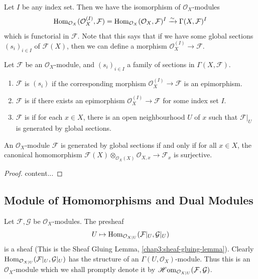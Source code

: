 Let $I$ be any index set. Then we have the isomorphism of $\mathcal{O}_X$-modules
\begin{equation*}
	\operatorname{Hom}_{\mathcal{O}_X}(\mathcal{O}_X^{(I)}, \mathcal{F}) = \operatorname{Hom}_{\mathcal{O}_X}(\mathcal{O}_X, \mathcal{F})^I \xrightarrow{\sim} \Gamma(X, \mathcal{F})^I
\end{equation*}
which is functorial in $\mathcal{F}$. Note that this says that if we have some global sections $(s_i)_{i \in I}$ of $\mathcal{F}(X)$, then we can define a morphism $\mathcal{O}_X^{(I)} \to \mathcal{F}$.

\begin{definition}
	Let $\mathcal{F}$ be an $\mathcal{O}_X$-module, and $(s_i)_{i\in I}$ a family of sections in $\Gamma(X, \mathcal{F})$. 
	
	\begin{enumerate}
		\item $\mathcal{F}$ is  $(s_i)$ if the corresponding morphism $\mathcal{O}_X^{(I)} \to \mathcal{F}$ is an epimorphism.
		
		\item $\mathcal{F}$ is  if there exists an epimorphism $\mathcal{O}_X^{(I)} \to \mathcal{F}$ for some index set $I$.
		
		\item $\mathcal{F}$ is  if for each $x \in X$, there is an open neighbourhood $U$ of $x$ such that $\mathcal{F}|_U$ is generated by global sections.
	\end{enumerate}
\end{definition}

\begin{lemma}
	An $\mathcal{O}_{X}$-module $\mathcal{F}$ is generated by global sections if and only if for all $x \in X$, the canonical homomorphism $\mathcal{F}(X) \otimes_{\mathcal{O}_{X}(X)} \mathcal{O}_{X, x} \to \mathcal{F}_x$ is surjective.
\end{lemma}
\begin{proof}
	content...
\end{proof}

\subsection*{Module of Homomorphisms and Dual Modules}

Let $\mathcal{F}, \mathcal{G}$ be $\mathcal{O}_X$-modules. The presheaf
\begin{equation*}
	U \mapsto \operatorname{Hom}_{\mathcal{O}_{X|U}}(\mathcal{F}|_{U}, \mathcal{G}|_{U})
\end{equation*}
is a sheaf (This is the Sheaf Gluing Lemma, \cref{chap3:sheaf-gluing-lemma}). Clearly $\operatorname{Hom}_{\mathcal{O}_{X|U}}(\mathcal{F}|_{U}, \mathcal{G}|_{U})$ has the structure of an $\Gamma(U, \mathcal{O}_X)$-module. Thus this is an $\mathcal{O}_X$-module which we shall promptly denote it by $\operatorname{\mathscr{H}om}_{\mathcal{O}_{X|U}}(\mathcal{F}, \mathcal{G})$.

